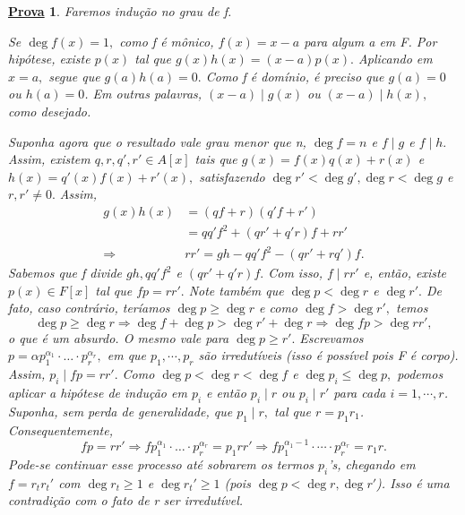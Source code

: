 \documentclass{article}
\newtheorem*{proof*}{\underline{Prova}}
\begin{document}
    \begin{proof*}
      Faremos indução no grau de f.

      Se \(\deg{f(x)} = 1,\) como f é mônico, \(f(x) = x-a\) para algum a em F. Por hipótese, existe \(p(x)\) tal que
      \(g(x)h(x) = (x-a)p(x).\) Aplicando em \(x=a,\) segue que \(g(a)h(a) = 0.\) Como f é domínio, é preciso que
      \(g(a) = 0\) ou \(h(a) = 0\). Em outras palavras, \((x-a)\mid g(x)\) ou \((x-a)\mid h(x),\) como desejado.

      Suponha agora que o resultado vale grau menor que n, \(\deg{f} = n\) e \(f\mid g\) e \(f\mid h.\) Assim, existem 
      \(q, r, q', r'\in A[x]\) tais que \(g(x) = f(x)q(x) + r(x)\) e \(h(x) = q'(x)f(x) + r'(x),\) satisfazendo
      \(\deg{r'} < \deg{g'}, \deg{r} < \deg{g}\) e \(r, r'\neq 0.\) Assim,
      \begin{align*}
        g(x)h(x) &= (qf + r)(q'f + r')\\
                 &= qq'f^{2} + (qr' + q'r)f + rr'\\
        \Rightarrow & rr' = gh - qq'f^{2} - (qr' + rq')f.
      \end{align*}
      Sabemos que f divide \(gh, qq'f^{2}\) e \((qr' + q'r)f.\) Com isso, \(f\mid rr'\) e, então,
      existe \(p(x)\in F[x]\) tal que \(fp = rr'.\) Note também que \(\deg{p} < \deg{r} \) e \(\deg{r'}.\) De fato,
      caso contrário, teríamos \(\deg{p}\geq \deg{r}\) e como \(\deg{f} > \deg{r'},\) temos 
      \[
        \deg{p}\geq \deg{r} \Rightarrow \deg{f} + \deg{p} > \deg{r'} + \deg{r} \Rightarrow \deg{fp} > \deg{rr'},
      \]
      o que é um absurdo. O mesmo vale para \(\deg{p}\geq r'.\) Escrevamos \(p = \alpha p_{1}^{\alpha_{1}}\cdot \dotsc \cdot p_{r}^{\alpha_{r}},\) 
      em que \(p_{1}, \cdots, p_{r}\) são irredutíveis (isso é possível pois F é corpo). Assim, \(p_{i}\mid fp = rr'.\) 
      Como \(\deg{p} < \deg{r} < \deg{f}\) e \(\deg{p_{i}}\leq \deg{p},\) podemos aplicar a hipótese de indução em \(p_{i}\) e então
      \(p_{i}\mid r\) ou \(p_{i}\mid r'\) para cada \(i=1, \cdots, r\). Suponha, sem perda de generalidade, que \(p_{1}\mid r,\) tal que 
      \(r=p_{1}r_{1}\). Consequentemente, 
      \[
        fp = rr' \Rightarrow fp_{1}^{\alpha_{1}}\cdot \dotsc \cdot p_{r}^{\alpha_{r}} = p_{1}rr' \Rightarrow fp_{1}^{\alpha_{1} -1}\cdot \cdots \cdot p_{r}^{\alpha_{r}} = r_{1}r.
      \]
      Pode-se continuar esse processo até sobrarem os termos \(p_{i}\)'s, chegando em
      \(f = r_{t}r_{t}'\) com \(\deg{r_{t}}\geq 1\) e \(\deg{r_{t}'}\geq 1\) (pois \(\deg{p} < \deg{r}, \deg{r'}\)). Isso é uma contradição
      com o fato de r ser irredutível.
    \end{proof*}
\end{document}
